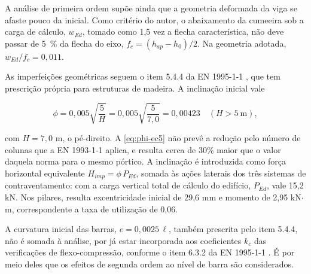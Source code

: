 A análise de primeira ordem supõe ainda que a geometria deformada da viga se
afaste pouco da inicial. Como critério do autor, o abaixamento da cumeeira sob a
carga de cálculo, $w_{Ed}$, tomado como 1,5 vez a flecha característica, não
deve passar de 5~\% da flecha do eixo, $f_c = (h_{ap} - h_0)/2$. Na geometria
adotada, $w_{Ed}/f_c = 0{,}011$.

As imperfeições geométricas seguem o item 5.4.4 da EN 1995-1-1
\cite{EN1995-1-1:2004}, que tem prescrição própria para estruturas de madeira.
A inclinação inicial vale

\begin{equation}
    \phi = 0{,}005\sqrt{\frac{5}{H}} = 0{,}005\sqrt{\frac{5}{7{,}0}} = 0{,}00423
    \quad (H > 5~\text{m}), \label{eq:phi-ec5}
\end{equation}

\noindent
com $H = 7{,}0$ m, o pé-direito. A \autoref{eq:phi-ec5} não prevê a redução
pelo número de colunas que a EN 1993-1-1 aplica, e resulta cerca de 30\% maior
que o valor daquela norma para o mesmo pórtico. A inclinação é introduzida como
força horizontal equivalente $H_{imp} = \phi\,P_{Ed}$, somada às ações
laterais dos três sistemas de contraventamento: com a carga vertical total de
cálculo do edifício, $P_{Ed}$, vale 15,2 kN. Nos pilares, resulta excentricidade inicial de 29,6 mm
e momento de 2,95 kN$\cdot$m, correspondente a taxa de utilização de 0,06.

A curvatura inicial das barras, $e = 0{,}0025\,\ell$, também prescrita pelo item
5.4.4, não é somada à análise, por já estar incorporada aos coeficientes $k_c$
das verificações de flexo-compressão, conforme o item 6.3.2 da
EN 1995-1-1 \cite{EN1995-1-1:2004}. É por meio deles que os efeitos de segunda
ordem ao nível de barra são considerados.
